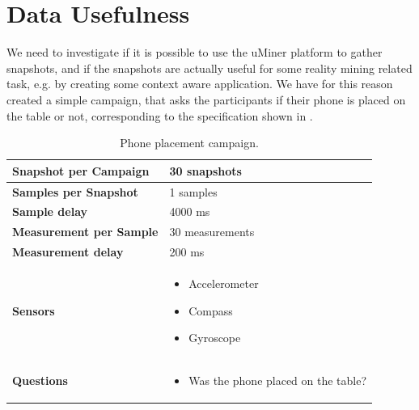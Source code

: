 
\section{Data Usefulness}
\label{sec:data_usefulness}

We need to investigate if it is possible to use the uMiner platform to gather snapshots, and if the snapshots are actually useful for some reality mining related task, e.g. by creating some context aware application. We have for this reason created a simple campaign, that asks the participants if their phone is placed on the table or not, corresponding to the specification shown in .

\begin{table}[!htbp]
    \centering
    \begin{tabular}{|m{}|m{}|} 
  \hline
  \textbf{Snapshot per Campaign}    & 30 snapshots      \\ \hline
  \textbf{Samples per Snapshot}     & 1 samples         \\ \hline
  \textbf{Sample delay}             & 4000 ms           \\ \hline
  \textbf{Measurement per Sample}   & 30 measurements   \\ \hline
  \textbf{Measurement delay}        & 200 ms            \\ \hline
  \textbf{Sensors}                  & \begin{itemize}[noitemsep]
                \item Accelerometer 
                \item Compass
                \item Gyroscope
              \end{itemize}                             \\ \hline
    \textbf{Questions}                & \begin{itemize}[noitemsep]
                                            \item Was the phone placed on the table?
                                        \end{itemize} \\ \hline
    \end{tabular}
    \caption{Phone placement campaign.}
    \label{tab:phone_placement_campaing}
\end{table}

